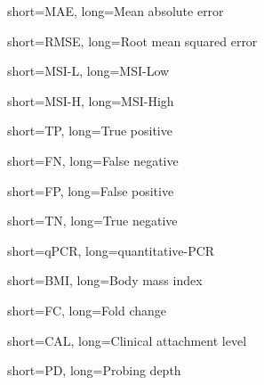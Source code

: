 {
    short=MAE,
    long=Mean absolute error
}

{
    short=RMSE,
    long=Root mean squared error
}

{
    short=MSI-L,
    long=MSI-Low
}

{
    short=MSI-H,
    long=MSI-High
}

{
    short=TP,
    long=True positive
}

{
    short=FN,
    long=False negative
}

{
    short=FP,
    long=False positive
}

{
    short=TN,
    long=True negative
}

{
    short=qPCR,
    long=quantitative-PCR
}

{
    short=BMI,
    long=Body mass index
}

{
    short=FC,
    long=Fold change
}

{
    short=CAL,
    long=Clinical attachment level
}

{
    short=PD,
    long=Probing depth
}
